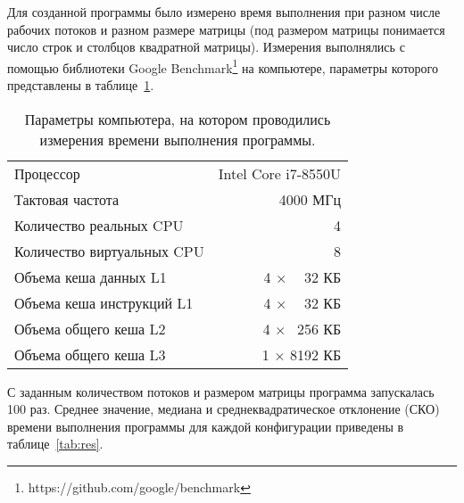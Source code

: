 \documentclass[a4paper,14pt]{extarticle}
\begin{document}
    Для созданной программы было измерено время выполнения при разном числе рабочих потоков и разном размере матрицы
    (под размером матрицы понимается число строк и столбцов квадратной матрицы).
    Измерения выполнялись с помощью библиотеки Google Benchmark\footnote{https://github.com/google/benchmark} на компьютере,
    параметры которого представлены в таблице~\ref{tab:par}.
    \begin{table}[b]
        \centering
        \begin{tabular}{lr}
            \toprule
            Процессор &  Intel\textregistered{} Core\texttrademark{}  i7-8550U  \\
            Тактовая частота & 4000 МГц \\
            \midrule
            Количество реальных CPU & 4 \\
            Количество виртуальных CPU & 8 \\
            \midrule
            Объема кеша данных L1 & 4 $\times$ $\;\,\;\,$32 КБ  \\
            Объема кеша инструкций L1 & 4 $\times$ $\;\,\;\,$32 КБ  \\
            Объема общего кеша L2 & 4 $\times$ $\;\,$256 КБ \\
            Объема общего кеша L3 & 1 $\times$ 8192 КБ \\
            \bottomrule
        \end{tabular}
        \caption{Параметры компьютера, на котором проводились измерения времени выполнения программы.}
        \label{tab:par}
    \end{table}
    С заданным количеством потоков и размером матрицы программа запускалась 100 раз.
    Среднее значение, медиана и среднеквадратическое отклонение (СКО) времени выполнения программы для каждой
    конфигурации приведены в таблице~\ref{tab:res}.
\end{document}

